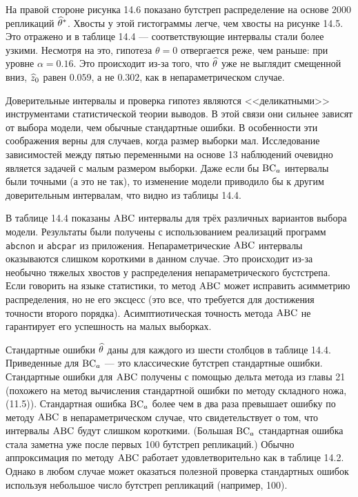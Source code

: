 На правой стороне рисунка 14.6 показано бутстреп распределение на основе 2000 репликаций $\widehat{\theta}^*$. Хвосты  у этой гистограммы легче, чем хвосты на рисунке 14.5. Это отражено и в таблице 14.4 --- соответствующие интервалы стали более узкими. Несмотря на это, гипотеза $\theta = 0$ 	отвергается реже, чем раньше: при уровне $\alpha = 0.16$. Это происходит из-за того, что $\widehat{\theta}$ уже не выглядит смещенной вниз, $\widehat{z}_0$ равен $0.059$, а не $0.302$, как в непараметрическом случае.

Доверительные интервалы и проверка гипотез являются <<деликатными>> инструментами статистической теории выводов. В этой связи они сильнее зависят от выбора модели, чем обычные стандартные ошибки. В особенности эти соображения верны для случаев, когда размер выборки мал. Исследование зависимостей между пятью переменными на основе 13 наблюдений очевидно является задачей с малым размером выборки. Даже если бы $\mathrm{BC}_a$ интервалы были точными (а это не так), то изменение модели приводило бы к другим доверительным интервалам, что видно из таблицы 14.4.

В таблице 14.4 показаны $\mathrm{ABC}$ интервалы для трёх различных вариантов выбора модели. Результаты были получены с использованием реализаций программ \texttt{abcnon} и \texttt{abcpar} из приложения. Непараметрические $\mathrm{ABC}$ интервалы оказываются слишком короткими в данном случае. Это происходит из-за необычно тяжелых хвостов у распределения непараметрического бустстрепа. Если говорить на языке статистики, то метод $\mathrm{ABC}$ может исправить асимметрию распределения, но не его эксцесс (это все, что требуется для достижения точности второго порядка). Асимптиотическая точность метода $\mathrm{ABC}$ не гарантирует его успешность на малых выборках.

Стандартные ошибки $\widehat{\theta}$ даны для каждого из шести столбцов в таблице 14.4. Приведенные для $\mathrm{BC}_a$ --- это классические бутстреп стандартные ошибки. Стандартные ошибки для $\mathrm{ABC}$ получены с помощью дельта метода из главы 21 (похожего на метод вычисления стандартной ошибки по методу складного ножа, (11.5)). Стандартная ошибка $\mathrm{BC}_a$ более чем в два раза превышает ошибку по методу $\mathrm{ABC}$ в непараметрическом случае, что свидетельствует о том, что интервалы $\mathrm{ABC}$ будут слишком короткими. (Большая $\mathrm{BC}_a$ стандартная ошибка стала заметна уже после первых 100 бутстреп репликаций.) Обычно аппроксимация по методу $\mathrm{ABC}$ работает удовлетворительно как в таблице 14.2. Однако в любом случае может оказаться полезной проверка стандартных ошибок используя небольшое число бутстреп репликаций (например, 100).

 




